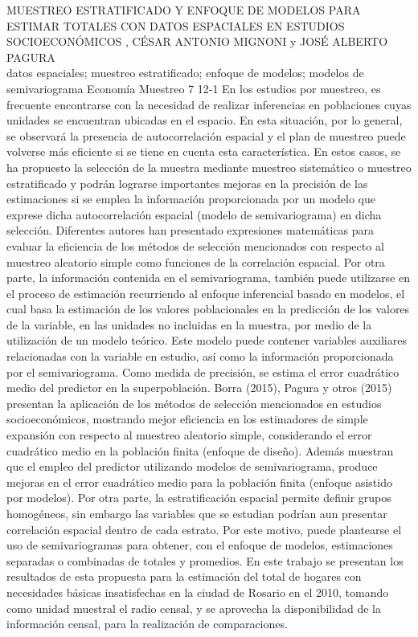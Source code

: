 \A
{MUESTREO ESTRATIFICADO Y ENFOQUE DE MODELOS PARA ESTIMAR TOTALES CON DATOS ESPACIALES EN ESTUDIOS SOCIOECONÓMICOS}
{, CÉSAR ANTONIO MIGNONI y JOSÉ ALBERTO PAGURA}
{
\\}
{datos espaciales; muestreo estratificado; enfoque de modelos; modelos de semivariograma} 
 {Economía} 
 {Muestreo} 
 {7} 
 {12-1}
{En los estudios por muestreo, es frecuente encontrarse con la necesidad de realizar inferencias en poblaciones cuyas unidades se encuentran ubicadas en el espacio. En esta situación, por lo general, se observará la presencia de autocorrelación espacial y el plan de muestreo puede volverse más eficiente si se tiene en cuenta esta característica. En estos casos, se ha propuesto la selección de la muestra mediante muestreo sistemático o muestreo estratificado y podrán lograrse importantes mejoras en la precisión de las estimaciones si se emplea la información proporcionada por un modelo que exprese dicha autocorrelación espacial (modelo de semivariograma) en dicha selección. Diferentes autores han presentado expresiones matemáticas para evaluar la eficiencia de los métodos de selección mencionados con respecto al muestreo aleatorio simple como funciones de la correlación espacial. Por otra parte, la información contenida en el semivariograma, también puede utilizarse en el proceso de estimación recurriendo al enfoque inferencial basado en modelos, el cual basa la estimación de los valores poblacionales en la predicción de los valores de la variable, en las unidades no incluidas en la muestra, por medio de la utilización de un modelo teórico. Este modelo puede contener variables auxiliares relacionadas con la variable en estudio, así como la información proporcionada por el semivariograma. Como medida de precisión, se estima el error cuadrático medio del predictor en la superpoblación. Borra (2015), Pagura y otros (2015) presentan la aplicación de los métodos de selección mencionados en estudios socioeconómicos, mostrando mejor eficiencia en los estimadores de simple expansión con respecto al muestreo aleatorio simple, considerando el error cuadrático medio en la población finita (enfoque de diseño). Además muestran que el empleo del predictor utilizando modelos de semivariograma, produce mejoras en el error cuadrático medio para la población finita (enfoque asistido por modelos). Por otra parte, la estratificación espacial permite definir grupos homogéneos, sin embargo las variables que se estudian podrían aun presentar correlación espacial dentro de cada estrato. Por este motivo, puede plantearse el uso de semivariogramas para obtener, con el enfoque de modelos, estimaciones separadas o combinadas de totales y promedios. En este trabajo se presentan los resultados de esta propuesta para la estimación del total de hogares con necesidades básicas insatisfechas en la ciudad de Rosario en el 2010, tomando como unidad muestral el radio censal, y se aprovecha la disponibilidad de la información censal, para la realización de comparaciones. }
